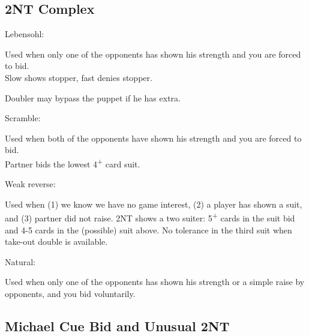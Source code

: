 \documentclass{article}
\renewcommand{\sp}{\ensuremath\spadesuit}
\newcommand{\he}{\ensuremath\heartsuit}
\newcommand{\di}{\ensuremath\diamondsuit}
\newcommand{\cl}{\ensuremath\clubsuit}
\newcommand{\nt}{\relsize{-1}NT\relsize{1}}
\newcommand{\up}{\textsuperscript{+}}
\newcommand{\al}{$\bullet$}
\begin{document}
\medskip


\subsection{2\nt{} Complex}
	Lebensohl:

	Used when only one of the opponents has shown his strength and you are forced to bid. \\
	Slow shows stopper, fast denies stopper.

	Doubler may bypass the puppet if he has extra.

	\medskip

	Scramble:

	Used when both of the opponents have shown his strength and you are forced to bid. \\
	Partner bids the lowest 4\up{} card suit.

	\medskip

	Weak reverse:

	Used when (1) we know we have no game interest, (2) a player has shown a suit, and (3) partner did not raise. 2\nt{} shows a two suiter: 5\up{} cards in the suit bid and 4-5 cards in the (possible) suit above. No tolerance in the third suit when take-out double is available.
	
	\medskip

	Natural:

	Used when only one of the opponents has shown his strength or a simple raise by opponents, and you bid voluntarily.

\subsection{Michael Cue Bid and Unusual 2\nt{}}
\end{document}
